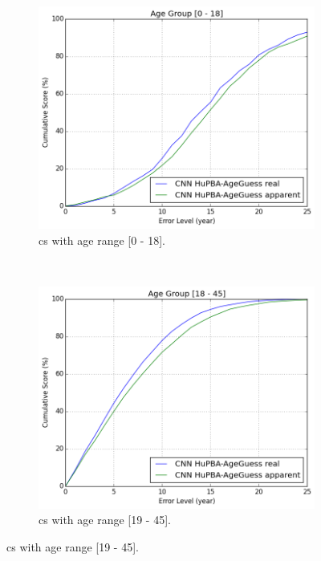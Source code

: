\begin{figure}[!h]
	\centering
	\begin{subfigure}[b]{0.5\textwidth}
		\includegraphics[width=\textwidth]{figures/results_cnn_cum_score_good_ag0}
		\caption{\acrshort{cs} with age range [0 - 18].}
		\label{fig:cumS_CNN_ag0}
	\end{subfigure}%
	~
	\begin{subfigure}[b]{0.5\textwidth}
		\includegraphics[width=\textwidth]{figures/results_cnn_cum_score_good_ag1}
		\caption{\acrshort{cs} with age range [19 - 45].}
		\label{fig:cumS_CNN_ag1}
	\end{subfigure} %
	

\end{figure}
